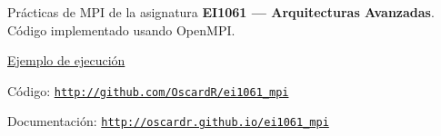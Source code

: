 Prácticas de M\-P\-I de la asignatura {\bfseries E\-I1061 — Arquitecturas Avanzadas}. Código implementado usando Open\-M\-P\-I.


\begin{DoxyItemize}
\item \hyperlink{ejemplo}{Ejemplo de ejecución }
\end{DoxyItemize}


\begin{DoxyItemize}
\item Código\-: \href{http://github.com/OscardR/ei1061_mpi}{\tt http\-://github.\-com/\-Oscard\-R/ei1061\-\_\-mpi}
\end{DoxyItemize}


\begin{DoxyItemize}
\item Documentación\-: \href{http://oscardr.github.io/ei1061_mpi}{\tt http\-://oscardr.\-github.\-io/ei1061\-\_\-mpi} 
\end{DoxyItemize}